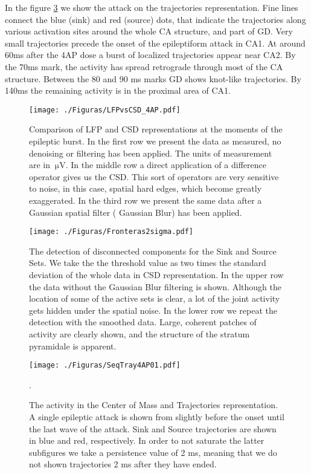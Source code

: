 \documentclass[12pt]{article}
\newcommand{\muV}[1]{\SI{#1}{\micro\volt}}
\begin{document}
In the figure \ref{tray4ap} we show the attack on the trajectories representation. Fine lines
connect the blue (sink) and red (source) dots, that indicate the trajectories along various activation
sites around the whole CA structure, and part of GD. Very small trajectories precede
the onset of the epileptiform attack in CA1. At around 60ms after the 4AP dose a burst
of localized trajectories appear near CA2. By the 70ms mark, the activity has spread
retrograde through most of the CA structure. Between the 80 and 90 ms marks
GD shows knot-like trajectories. By 140ms the remaining activity is in the proximal
area of CA1.




\begin{figure}
  \texttt{[image: ./Figuras/LFPvsCSD\_4AP.pdf]}
  \caption{Comparison of LFP and CSD representations
    at the moments of the epileptic burst. In the first row
    we present the data as measured, no denoising or filtering has
    been applied. The units of measurement are in $\muV{}$. In
    the middle row a direct application of a difference operator
    gives us the CSD. This sort of operators are very sensitive
    to noise, in this case, spatial hard edges, which become
    greatly exaggerated. In the third row we present the same
    data after a Gaussian spatial filter ( Gaussian Blur) has
    been applied. }\label{lfpycsd4ap}
\end{figure}

\begin{figure}
  \texttt{[image: ./Figuras/Fronteras2sigma.pdf]}
  \caption{The detection of disconnected components for the Sink and Source
    Sets. We take the the threshold value as two times the
    standard deviation of the whole data in CSD representation. In
    the upper row the data without the Gaussian Blur filtering is shown.
    Although the location of some of the active sets is clear, a lot of the
    joint activity gets hidden under the spatial noise. In the lower
    row we repeat the detection with the smoothed data. Large, coherent
    patches of activity are clearly shown, and the structure of the
    stratum pyramidale is apparent. 
  }\label{csdfrontera}
\end{figure}


\begin{figure}
  \texttt{[image: ./Figuras/SeqTray4AP01.pdf]}
  \caption{ The activity in the Center of Mass and Trajectories representation.
    A single epileptic attack is shown from slightly before the onset until the
    last wave of the attack. Sink and Source trajectories are shown in blue
    and red, respectively. In order to not saturate the latter subfigures
    we take a persistence value of 2 ms, meaning that we do not shown
    trajectories 2 ms after they have ended.}\label{tray4ap}.
 \end{figure}
\end{document}
